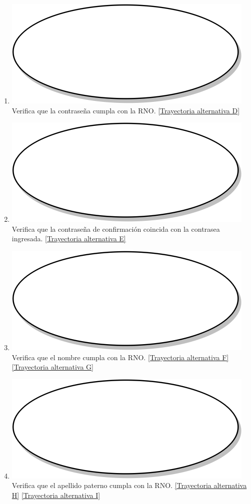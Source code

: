 \begin{enumerate}
  \item {\includegraphics[scale=.05]{Capitulo3/img/proceso.png} Verifica que la contraseña cumpla con la RNO. \hyperref[cu2_ta_d]{[Trayectoria alternativa D]}}
  \item {\includegraphics[scale=.05]{Capitulo3/img/proceso.png} Verifica que la contraseña de confirmación coincida con la contrasea ingresada. \hyperref[cu2_ta_e]{[Trayectoria alternativa E]}}
  \item {\includegraphics[scale=.05]{Capitulo3/img/proceso.png} Verifica que el nombre cumpla con la RNO. \hyperref[cu2_ta_f]{[Trayectoria alternativa F]} \hyperref[cu2_ta_g]{[Trayectoria alternativa G]}}
  \item {\includegraphics[scale=.05]{Capitulo3/img/proceso.png} Verifica que el apellido paterno cumpla con la RNO. \hyperref[cu2_ta_h]{[Trayectoria alternativa H]} \hyperref[cu2_ta_i]{[Trayectoria alternativa I]}}

\end{enumerate}
